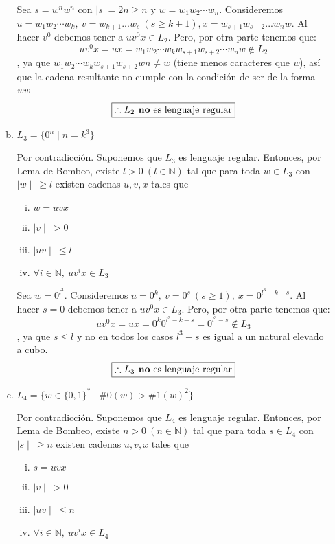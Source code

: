 \documentclass{article}
\begin{document}
\begin{enumerate}
\begin{enumerate}[a)]
          Sea $s = w^nw^n$ con $\mid s \mid = 2n \ge n$ y $w = w_1w_2 \cdots w_n$. Consideremos $u = w_1w_2 \cdots w_k, ~ v = w_{k+1}...w_{s}~(s \ge k+1), x = w_{s+1}w_{s+2}...w_nw$.
          Al hacer $v^0$ debemos tener a $uv^0x \in L_2$. Pero, por otra parte tenemos que:
          $$uv^0x = ux = w_1w_2\cdots w_k w_{s+1}w_{s+2}\cdots w_nw \notin L_2$$,
          ya que $w_1w_2 \cdots w_kw_{s+1}w_{s+2}wn \neq w$ (tiene menos caracteres que \textit w), así que la cadena resultante no cumple con la condición de ser de la forma \textit{ww}
          $$\boxed{\therefore L_2 \text{\textbf{ no} es lenguaje regular}}$$

        \item $L_3 = \{0^n \mid n = k^3\}$ 

          Por contradicción. Suponemos que $L_3$ es lenguaje regular. Entonces, por Lema de Bombeo, existe $l > 0~(l \in \mathbb{N})$ tal que para toda $w \in L_3$ con $\mid w \mid ~ \ge l$ existen cadenas $u,v,x$ tales que
          \begin{enumerate}[i)]
            \item $w = uvx$
            \item $\mid v \mid ~ > 0$
            \item $\mid uv \mid ~ \le l$
            \item $\forall i \in \mathbb N, ~ uv^ix \in L_3$
          \end{enumerate}

          Sea $w = 0^{l^3} $. Consideremos  $u = 0^k, ~ v = 0^s~ (s \ge 1), ~ x = 0^{l^3 - k - s}$. Al hacer $ s = 0$ debemos tener a $uv^0x \in L_3$. Pero, por otra parte tenemos que:
          $$uv^0x = ux = 0^k0^{l^3 - k - s} = 0^{l^3 - s} \notin L_3$$,
          ya que $s \le l$ y no en todos los casos $l^3 - s$ es igual a un natural elevado a cubo.
          $$\boxed{\therefore L_3 \text{\textbf{ no} es lenguaje regular}}$$

        \item $L_4 = \{w \in \{0,1\}^* \mid \#0(w) > \#1(w)^2\}$

          Por contradicción. Suponemos que $L_4$ es lenguaje regular. Entonces, por Lema de Bombeo, existe $n > 0~(n \in \mathbb{N})$ tal que para toda $s \in L_4$ con $\mid s \mid ~ \ge n$ existen cadenas $u,v,x$ tales que
          \begin{enumerate}[i)]
            \item $s = uvx$
            \item $\mid v \mid ~ > 0$
            \item $\mid uv \mid ~ \le n$
            \item $\forall i \in \mathbb N, ~ uv^ix \in L_4$
          \end{enumerate}


\end{enumerate}
\end{enumerate}
\end{document}
